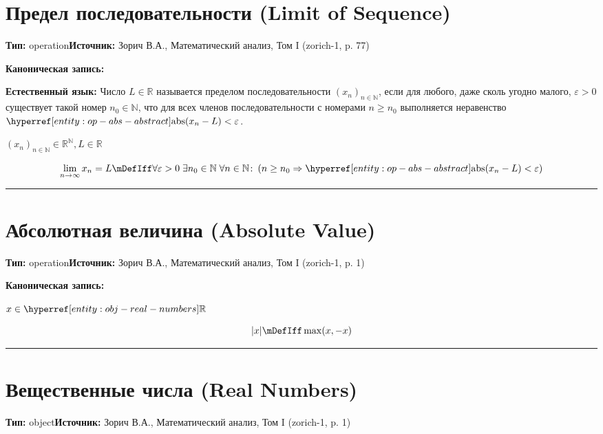 \documentclass{report}
\begin{document}
\section{Предел последовательности (Limit of Sequence)}\label{entity:op-limit-seq}
\textbf{Тип:} operation\quad \textbf{Источник:} Зорич В.А., Математический анализ, Том I (zorich-1, p. 77)

\textbf{Каноническая запись:}

\textbf{Естественный язык:}
Число $L \in \mathbb{R}$ называется пределом последовательности $(x_n)_{n \in \mathbb{N}}$, если для любого, даже сколь угодно малого, $\varepsilon > 0$ существует такой номер $n_0 \in \mathbb{N}$, что для всех членов последовательности с номерами $n \geq n_0$ выполняется неравенство $\entityref{op-abs-abstract}{\mathrm{abs}}(x_n - L) < \varepsilon$. 

\begin{operation}
$(x_n)_{n \in \mathbb{N}} \in \mathbb{R}^{\mathbb{N}}, L \in \mathbb{R}$

\[
\mLim_{n \to \infty} x_n = L \mDefIff \Forall{\varepsilon > 0}\; \mExists{n_0 \in \mathbb{N}}\; \Forall{n \in \mathbb{N}} \colon \left( n \geq n_0 \mImplies \entityref{op-abs-abstract}{\mathrm{abs}}(x_n - L) < \varepsilon \right)
\]
\end{operation}


\vspace{1em}
\hrule
\vspace{1em}

\section{Абсолютная величина (Absolute Value)}\label{entity:op-abs-abstract}
\textbf{Тип:} operation\quad \textbf{Источник:} Зорич В.А., Математический анализ, Том I (zorich-1, p. 1)

\textbf{Каноническая запись:}

\begin{operation}

$x \in \entityref{obj-real-numbers}{\mathbb{R}}$

\[ |x| \mDefIff \max(x, -x) \]
\end{operation}


\vspace{1em}
\hrule
\vspace{1em}

\section{Вещественные числа (Real Numbers)}\label{entity:obj-real-numbers}
\textbf{Тип:} object\quad \textbf{Источник:} Зорич В.А., Математический анализ, Том I (zorich-1, p. 1)
\end{document}
